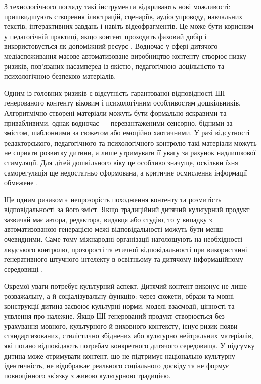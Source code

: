 \documentclass[14pt, a4paper]{extreport}
\begin{document}
З технологічного погляду такі інструменти відкривають нові можливості: пришвидшують створення ілюстрацій, сценаріїв, аудіосупроводу, навчальних текстів, інтерактивних завдань і навіть відеофрагментів. Це може бути корисним у педагогічній практиці, якщо контент проходить фаховий добір і використовується як допоміжний ресурс \cite{UNESCO2023}. Водночас у сфері дитячого медіаспоживання масове автоматизоване виробництво контенту створює низку ризиків, пов'язаних насамперед із якістю, педагогічною доцільністю та психологічною безпекою матеріалів.

Одним із головних ризиків є відсутність гарантованої відповідності ШІ-генерованого контенту віковим і психологічним особливостям дошкільників. Алгоритмічно створені матеріали можуть бути формально яскравими та привабливими, однак водночас --- перевантаженими сенсорно, бідними за змістом, шаблонними за сюжетом або емоційно хаотичними. У разі відсутності редакторського, педагогічного та психологічного контролю такі матеріали можуть не сприяти розвитку дитини, а лише утримувати її увагу за рахунок надлишкової стимуляції. Для дітей дошкільного віку це особливо значуще, оскільки їхня саморегуляція ще недостатньо сформована, а критичне осмислення інформації обмежене \cite{PavelkivTsyhypalo2006,DutkevychDoshkilna2007,Radesky2023}.

Ще одним ризиком є непрозорість походження контенту та розмитість відповідальності за його зміст. Якщо традиційний дитячий культурний продукт зазвичай має автора, редактора, видавця або студію, то у випадку з автоматизованою генерацією межі відповідальності можуть бути менш очевидними. Саме тому міжнародні організації наголошують на необхідності людського контролю, прозорості та етичної відповідальності при використанні генеративного штучного інтелекту в освітньому та дитячому інформаційному середовищі \cite{UNESCO2023,UNICEFAI2021,OECD2021}.

Окремої уваги потребує культурний аспект. Дитячий контент виконує не лише розважальну, а й соціалізувальну функцію: через сюжети, образи та мовні конструкції дитина засвоює культурні норми, моделі взаємодії, цінності та уявлення про належне. Якщо ШІ-генерований продукт створюється без урахування мовного, культурного й виховного контексту, існує ризик появи стандартизованих, стилістично збіднених або культурно нейтральних матеріалів, які погано відповідають потребам конкретного дитячого середовища. У підсумку дитина може отримувати контент, що не підтримує національно-культурну ідентичність, не відображає реального соціального досвіду та не формує повноцінного зв'язку з живою культурною традицією.
\end{document}
